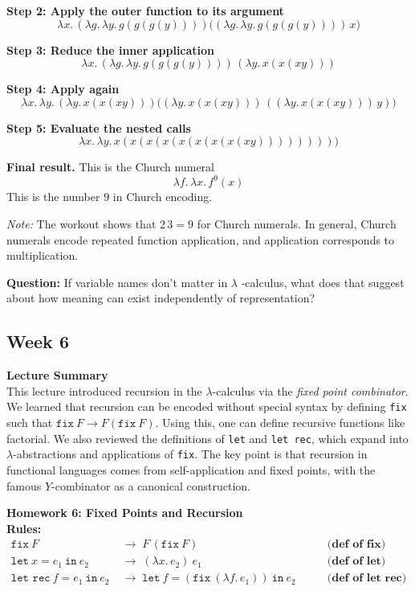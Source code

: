 \documentclass{article}
\theoremstyle{theorem}
\theoremstyle{definition}
\theoremstyle{remark}
\begin{document}
\noindent
\textbf{Step 2: Apply the outer function to its argument}
\[
\lambda x.\, (\lambda g.\,\lambda y.\, g(g(g(y)))) \big( (\lambda g.\,\lambda y.\, g(g(g(y))))\, x \big)
\]

\noindent
\textbf{Step 3: Reduce the inner application}
\[
\lambda x.\, (\lambda g.\,\lambda y.\, g(g(g(y)))) \, (\lambda y.\, x(x(xy)))
\]

\noindent
\textbf{Step 4: Apply again}
\[
\lambda x.\,\lambda y.\, (\lambda y.\, x(x(xy))) \big((\lambda y.\, x(x(xy))) \, ((\lambda y.\, x(x(xy)))\, y)\big)
\]

\noindent
\textbf{Step 5: Evaluate the nested calls}
\[
\lambda x.\,\lambda y.\, x(x(x(x(x(x(x(x(xy)))))))))
\]

\noindent
\textbf{Final result.} This is the Church numeral
\[
\lambda f.\,\lambda x.\, f^9(x)
\]
This is the number $9$ in Church encoding.

\medskip
\noindent
\emph{Note:} The workout shows that $2\,3 = 9$ for Church numerals. In general, Church numerals encode repeated function application, and application corresponds to multiplication.

\textbf{Question:} If variable names don’t matter in $\lambda$
-calculus, what does that suggest about how meaning can exist independently of representation?

\subsection{Week 6}

\textbf{Lecture Summary}\\  
This lecture introduced recursion in the $\lambda$-calculus via the \textit{fixed point combinator}. We learned that recursion can be encoded without special syntax by defining \texttt{fix} such that $\texttt{fix}\ F \to F(\texttt{fix}\ F)$. Using this, one can define recursive functions like factorial. We also reviewed the definitions of \texttt{let} and \texttt{let rec}, which expand into $\lambda$-abstractions and applications of \texttt{fix}. The key point is that recursion in functional languages comes from self-application and fixed points, with the famous $Y$-combinator as a canonical construction.

\textbf{Homework 6: Fixed Points and Recursion}\\

\textbf{Rules:}\\
\[
\begin{aligned}
\texttt{fix}\ F &\;\to\; F\,(\texttt{fix}\ F) \qquad &\textbf{(def of fix)}\\
\texttt{let}\ x=e_1\ \texttt{in}\ e_2 &\;\to\; (\lambda x.\,e_2)\ e_1 \qquad &\textbf{(def of let)}\\
\texttt{let rec}\ f=e_1\ \texttt{in}\ e_2 &\;\to\; \texttt{let}\ f=(\texttt{fix}\ (\lambda f.\,e_1))\ \texttt{in}\ e_2 \qquad &\textbf{(def of let rec)}
\end{aligned}
\]
\end{document}
